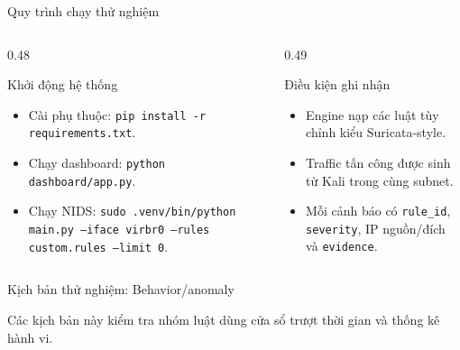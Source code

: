 \documentclass[t, aspectratio=169]{beamer}
\begin{document}
\begin{frame}{Quy trình chạy thử nghiệm}
    \small
    \begin{columns}[T,onlytextwidth]
        \begin{column}{0.48\textwidth}
            \begin{block}{Khởi động hệ thống}
                \begin{itemize}
                    \item Cài phụ thuộc: \texttt{pip install -r requirements.txt}.
                    \item Chạy dashboard: \texttt{python dashboard/app.py}.
                    \item Chạy NIDS: \texttt{sudo .venv/bin/python main.py --iface virbr0 --rules custom.rules --limit 0}.
                \end{itemize}
            \end{block}
        \end{column}
        \begin{column}{0.49\textwidth}
            \begin{alertblock}{Điều kiện ghi nhận}
                \begin{itemize}
                    \item Engine nạp các luật tùy chỉnh kiểu Suricata-style.
                    \item Traffic tấn công được sinh từ Kali trong cùng subnet.
                    \item Mỗi cảnh báo có \texttt{rule\_id}, \texttt{severity}, IP nguồn/đích và \texttt{evidence}.
                \end{itemize}
            \end{alertblock}
        \end{column}
    \end{columns}
\end{frame}

\begin{frame}{Kịch bản thử nghiệm: Behavior/anomaly}
    \small
    \renewcommand{\arraystretch}{1.35}

    \vspace{0.5cm}
    Các kịch bản này kiểm tra nhóm luật dùng cửa sổ trượt thời gian và thống kê hành vi.
\end{frame}
\end{document}
